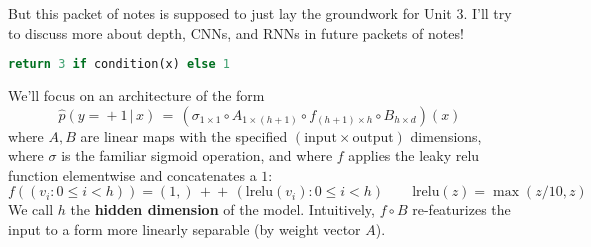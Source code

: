   But this packet of notes is supposed to just lay the groundwork for Unit 3.
  I'll try to discuss more about depth, CNNs, and RNNs in future packets of
  notes!



\marginnote{\veryoptional}
\marginnote{\veryoptional}
\marginnote{\veryoptional}
  \begin{lstlisting}[language=Python, basicstyle=\footnotesize\ttfamily]
    return 3 if condition(x) else 1
  \end{lstlisting}


  We'll focus on an architecture of the form
  $$
    \hat p(y\!=\!+1\,|\,x) \,=\,
    (\sigma_{1\times 1} \circ
    A_{1\times (h+1)} \circ
    f_{(h+1)\times h} \circ
    B_{h\times d})(x)
  $$
  where $A,B$ are linear maps with the specified
  $(\text{input}\times\text{output})$ dimensions, where $\sigma$ is the
  familiar sigmoid operation, and where $f$ applies the leaky relu
  function elementwise and concatenates a $1$:
  $$
    f((v_i : 0\leq i<h)) = (1,)\,+\!\!\!\!+\,(\text{lrelu}(v_i) : 0\leq i<h)
    \quad \quad
    \text{lrelu}(z) = \max(z/10, z)
  $$
  We call $h$ the \textbf{hidden dimension} of the model.
  Intuitively, $f \circ B$ re-featurizes the input to a form more
  linearly separable (by weight vector $A$).



